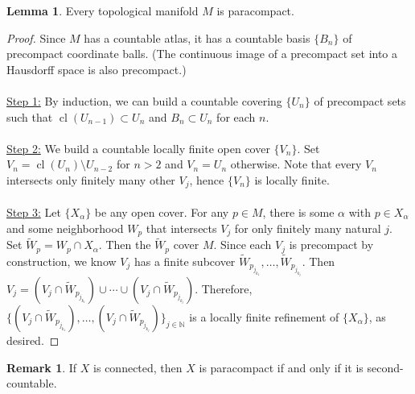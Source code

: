 \documentclass[10pt,letterpaper,cm]{nupset}
\theoremstyle{definition}
\newtheorem{remark}{Remark}
\newtheorem{lemma}{Lemma}
\newcommand{\N}{\mathbb N}
\newcommand{\1}{\mathbf{1}}
\newcommand{\0}{\vec 0}
\DeclareMathOperator{\cl}{cl}
\begin{document}
\begin{lemma}
Every topological manifold $M$ is paracompact. 
\end{lemma}

\begin{proof}
Since $M$ has a countable atlas, it has a countable basis $\{B_n\}$ of precompact coordinate balls. (The continuous image of a precompact set into a Hausdorff space is also precompact.)
\\ \\
\underline{Step 1:} By induction, we can build a countable covering $\{U_n\}$ of precompact sets such that $\cl(U_{n-1}) \subset U_n$ and $B_n \subset U_n$ for each $n$.
\\ \\
\underline{Step 2:} We build a countable locally finite open cover $\{V_n\}$. Set $V_n = \cl(U_n) \setminus U_{n-2}$ for $n > 2$ and $V_n = U_n$ otherwise. Note that every $V_n$ intersects only finitely many other $V_j$, hence $\{V_n\}$ is locally finite.
\\ \\
\underline{Step 3:} Let $\{X_\alpha\}$ be any open cover. For any $p \in M$, there is some $\alpha$ with $p\in X_\alpha$ and some neighborhood $W_p$ that intersects $V_j$ for only finitely many natural $j$. Set $\widetilde{W}_p = W_p \cap X_\alpha$. Then the $\widetilde{W}_p$ cover $M$. Since each $V_j$ is precompact by construction, we know $V_j$ has a finite subcover $\widetilde{W}_{p_{j_{k_1}}}, \ldots, \widetilde{W}_{p_{j_{k_j}}}$. Then $V_j = (V_j \cap \widetilde{W}_{p_{j_{k_1}}}) \cup \cdots \cup (V_j \cap \widetilde{W}_{p_{j_{k_j}}})$. Therefore, $\{(V_j \cap \widetilde{W}_{p_{j_{k_1}}}), \ldots, (V_j \cap \widetilde{W}_{p_{j_{k_j}}})\}_{j \in \N}$ is a locally finite refinement of $\{X_\alpha\}$, as desired.
\end{proof}

\begin{remark}
If $X$ is connected, then $X$ is paracompact if and only if it is second-countable.  
\end{remark}
\end{document}
